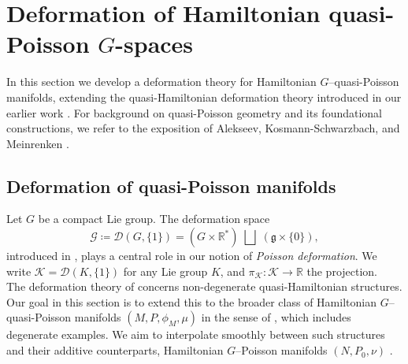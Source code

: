 \documentclass[reqno]{amsart}
\theoremstyle{plain}
\theoremstyle{definition}
\newcommand{\R}{\mathbb{R}}
\newcommand{\too}{\longrightarrow}
\begin{document}
\section{Deformation of Hamiltonian quasi-Poisson $G$-spaces} \label{sec 2}
In this section we develop a deformation theory for Hamiltonian $G$–quasi-Poisson manifolds, extending the quasi-Hamiltonian deformation theory introduced in our earlier work \cite{JMM2025deformations}. For background on quasi-Poisson geometry and its foundational constructions, we refer to the exposition of Alekseev, Kosmann-Schwarzbach, and Meinrenken \cite{alekseev2002quasi}.

\subsection{Deformation of quasi-Poisson manifolds}

Let $G$ be a compact Lie group. The deformation space
\[
\mathcal{G}\coloneqq \mathcal{D}(G,\{1\})=(G\times\mathbb{R}^{*})\;\bigsqcup\;(\mathfrak{g}\times\{0\}),
\]
introduced in \cite{JMM2025deformations}, plays a central role in our notion of \emph{Poisson deformation}. We write $\mathcal{K}=\mathcal{D}(K,\{1\})$ for any Lie group $K$, and $\pi_{\mathcal{K}}: \mathcal{K} \too \R$ the projection.\\
The deformation theory of \cite{JMM2025deformations} concerns non-degenerate quasi-Hamiltonian structures. Our goal in this section is to extend this to the broader class of Hamiltonian $G$--quasi-Poisson manifolds $(M,P,\phi_{M},\mu)$ in the sense of \cite[]{alekseev2002quasi}, which includes degenerate examples. We aim to interpolate smoothly between such structures and their additive counterparts, Hamiltonian $G$--Poisson manifolds $(N,P_{0},\nu)$ \cite[]{alekseev2002quasi}.
\end{document}
